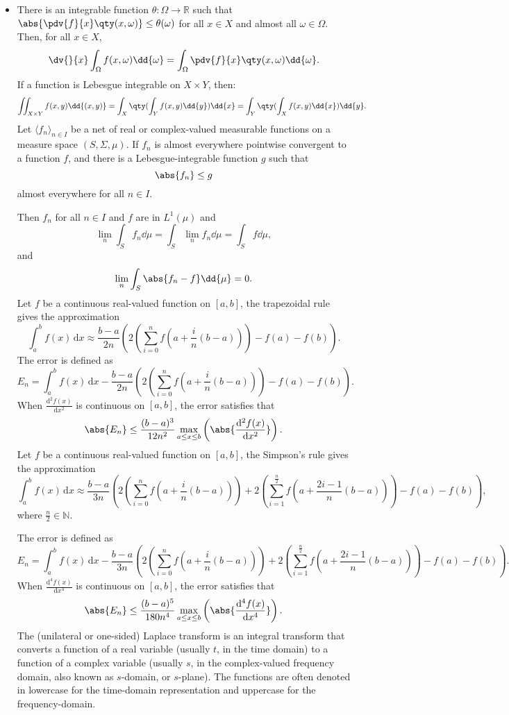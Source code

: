 \documentclass[a4paper,12pt]{report}
\begin{document}
\begin{itemize}
\begin{itemize}
\item There is an integrable function $\theta\colon\Omega\to\mathbb{R}$ such that $\abs{\pdv{f}{x}\qty(x,\omega)}\leq\theta(\omega)$ for all $x\in X$ and almost all $\omega\in\Omega$.
\een
Then, for all $x\in X$,
\[\dv{}{x}\int_{\Omega}f(x,\omega)\dd{\omega}=\int_{\Omega}\pdv{f}{x}\qty(x,\omega)\dd{\omega}.\]
If a function is Lebesgue integrable on $X\times Y$, then:
\[\iint_{X\times Y}f(x,y)\dd{(x,y)}=\int_X\qty(\int_Yf(x,y)\dd{y})\dd{x}=\int_Y\qty(\int_Xf(x,y)\dd{x})\dd{y}.\]
Let $\langle f_n\rangle_{n\in I}$ be a net of real or complex-valued measurable functions on a measure space $(S,\Sigma,\mu)$. If $f_n$ is almost everywhere pointwise convergent to a function $f$, and there is a Lebesgue-integrable function $g$ such that
\[\abs{f_n}\leq g\]
almost everywhere for all $n\in I$.

Then $f_n$ for all $n\in I$ and $f$ are in $L^1(\mu)$ and
\[\lim_n\int_Sf_n\dd{\mu}=\int_S\lim_nf_n\dd{\mu}=\int_Sf\dd{\mu},\]
and
\[\lim_n\int_S\abs{f_n-f}\dd{\mu}=0.\]
Let $f$ be a continuous real-valued function on $[a,b]$, the trapezoidal rule gives the approximation
\[\int_a^bf(x)\,\mathrm{d}x\approx\frac{b-a}{2n}\left(2\left(\sum_{i=0}^nf(a+\frac{i}{n}(b-a))\right)-f(a)-f(b)\right).\]
The error is defined as
\[E_n=\int_a^bf(x)\,\mathrm{d}x-\frac{b-a}{2n}\left(2\left(\sum_{i=0}^nf(a+\frac{i}{n}(b-a))\right)-f(a)-f(b)\right).\]
When $\frac{\mathrm{d}^2f(x)}{\mathrm{d}x^2}$ is continuous on $[a,b]$, the error satisfies that
\[\abs{E_n}\leq\frac{(b-a)^3}{12n^2}\max_{a\leq x\leq b}\left(\abs{\frac{\mathrm{d}^2f(x)}{\mathrm{d}x^2}}\right).\]
Let $f$ be a continuous real-valued function on $[a,b]$, the Simpson's rule gives the approximation
\[\int_a^bf(x)\,\mathrm{d}x\approx\frac{b-a}{3n}\left(2\left(\sum_{i=0}^nf(a+\frac{i}{n}(b-a))\right)+2\left(\sum_{i=1}^{\frac{n}{2}}f(a+\frac{2i-1}{n}(b-a))\right)-f(a)-f(b)\right),\]
where $\frac{n}{2}\in\mathbb{N}$.

The error is defined as
\[E_n=\int_a^bf(x)\,\mathrm{d}x-\frac{b-a}{3n}\left(2\left(\sum_{i=0}^nf(a+\frac{i}{n}(b-a))\right)+2\left(\sum_{i=1}^{\frac{n}{2}}f(a+\frac{2i-1}{n}(b-a))\right)-f(a)-f(b)\right).\]
When $\frac{\mathrm{d}^4f(x)}{\mathrm{d}x^4}$ is continuous on $[a,b]$, the error satisfies that
\[\abs{E_n}\leq\frac{(b-a)^5}{180n^4}\max_{a\leq x\leq b}\left(\abs{\frac{\mathrm{d}^4f(x)}{\mathrm{d}x^4}}\right).\]
The (unilateral or one-sided) Laplace transform is an integral transform that converts a function of a real variable (usually $t$, in the time domain) to a function of a complex variable (usually $s$, in the complex-valued frequency domain, also known as $s$-domain, or $s$-plane). The functions are often denoted in lowercase for the time-domain representation and uppercase for the frequency-domain.


\end{itemize}
\end{itemize}
\end{document}
